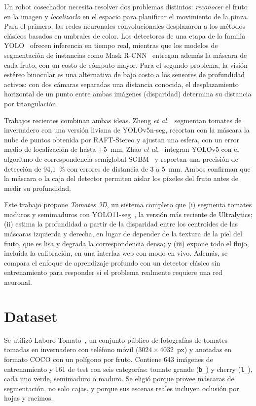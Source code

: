 \documentclass[conference]{IEEEtran}
\begin{document}
Un robot cosechador necesita resolver dos problemas distintos: \emph{reconocer} el fruto en la imagen y \emph{localizarlo} en el espacio para planificar el movimiento de la pinza. Para el primero, las redes neuronales convolucionales desplazaron a los métodos clásicos basados en umbrales de color. Los detectores de una etapa de la familia YOLO~\cite{redmon2016} ofrecen inferencia en tiempo real, mientras que los modelos de segmentación de instancias como Mask R-CNN~\cite{he2017} entregan además la máscara de cada fruto, con un costo de cómputo mayor. Para el segundo problema, la visión estéreo binocular es una alternativa de bajo costo a los sensores de profundidad activos: con dos cámaras separadas una distancia conocida, el desplazamiento horizontal de un punto entre ambas imágenes (disparidad) determina su distancia por triangulación.

Trabajos recientes combinan ambas ideas. Zheng \emph{et al.}~\cite{zheng2023} segmentan tomates de invernadero con una versión liviana de YOLOv5n-seg, recortan con la máscara la nube de puntos obtenida por RAFT-Stereo y ajustan una esfera, con un error medio de localización de hasta $\pm5$~mm. Zhao \emph{et al.}~\cite{zhao2025} integran YOLOv5 con el algoritmo de correspondencia semiglobal SGBM~\cite{hirschmuller2008} y reportan una precisión de detección de 94,1~\% con errores de distancia de 3 a 5~mm. Ambos confirman que la máscara o la caja del detector permiten aislar los píxeles del fruto antes de medir su profundidad.

Este trabajo propone \emph{Tomates 3D}, un sistema completo que (i) segmenta tomates maduros y semimaduros con YOLO11-seg~\cite{yolo11}, la versión más reciente de Ultralytics; (ii) estima la profundidad a partir de la disparidad entre los centroides de las máscaras izquierda y derecha, en lugar de depender de la textura de la piel del fruto, que es lisa y degrada la correspondencia densa; y (iii) expone todo el flujo, incluida la calibración, en una interfaz web con modo en vivo. Además, se compara el enfoque de aprendizaje profundo con un detector clásico sin entrenamiento para responder si el problema realmente requiere una red neuronal.

\section{Dataset}
Se utilizó Laboro Tomato~\cite{laboro}, un conjunto público de fotografías de tomates tomadas en invernadero con teléfono móvil ($3024\times4032$~px) y anotadas en formato COCO con un polígono por fruto. Contiene 643 imágenes de entrenamiento y 161 de test con seis categorías: tomate grande (\texttt{b\_}) y cherry (\texttt{l\_}), cada uno verde, semimaduro o maduro. Se eligió porque provee máscaras de segmentación, no solo cajas, y porque sus escenas reales incluyen oclusión por hojas y racimos.
\end{document}
